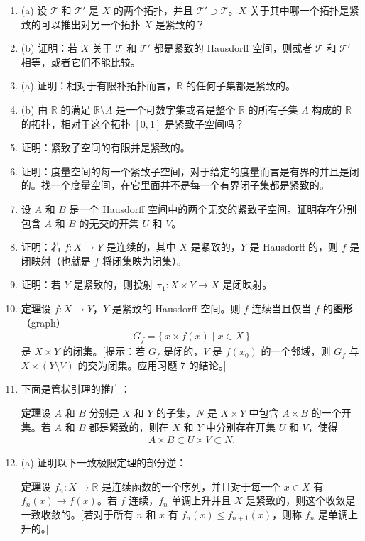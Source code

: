 \begin{enumerate}
\item (a) 设 $\mathscr{T}$ 和 $\mathscr{T}'$ 是 $X$ 的两个拓扑，并且 $\mathscr{T}'\supset\mathscr{T}$。$X$ 关于其中哪一个拓扑是紧致的可以推出对另一个拓扑 $X$ 是紧致的？
\item (b) 证明：若 $X$ 关于 $\mathscr{T}$ 和 $\mathscr{T}'$ 都是紧致的 Hausdorff 空间，则或者 $\mathscr{T}$ 和 $\mathscr{T}'$ 相等，或者它们不能比较。
\item (a) 证明：相对于有限补拓扑而言，$\mathbb{R}$ 的任何子集都是紧致的。
\item (b) 由 $\mathbb{R}$ 的满足 $\mathbb{R}\setminus A$ 是一个可数字集或者是整个 $\mathbb{R}$ 的所有子集 $A$ 构成的 $\mathbb{R}$ 的拓扑，相对于这个拓扑 $[0,1]$ 是紧致子空间吗？
\item 证明：紧致子空间的有限并是紧致的。
\item 证明：度量空间的每一个紧致子空间，对于给定的度量而言是有界的并且是闭的。找一个度量空间，在它里面并不是每一个有界闭子集都是紧致的。
\item 设 $A$ 和 $B$ 是一个 Hausdorff 空间中的两个无交的紧致子空间。证明存在分别包含 $A$ 和 $B$ 的无交的开集 $U$ 和 $V$。
\item 证明：若 $f\colon X\to Y$ 是连续的，其中 $X$ 是紧致的，$Y$ 是 Hausdorff 的，则 $f$ 是闭映射（也就是 $f$ 将闭集映为闭集）。
\item 证明：若 $Y$ 是紧致的，则投射 $\pi_{1}\colon X\times Y\to X$ 是闭映射。
\item \textbf{定理}\quad 设 $f\colon X\to Y$，$Y$ 是紧致的 Hausdorff 空间。则 $f$ 连续当且仅当 $f$ 的\textbf{图形}（graph）
\begin{align*}
G_{f}=\{\,x\times f(x)\mid x\in X\,\}
\end{align*}
是 $X\times Y$ 的闭集。[提示：若 $G_{f}$ 是闭的，$V$ 是 $f(x_{0})$ 的一个邻域，则 $G_{f}$ 与 $X\times(Y\setminus V)$ 的交为闭集。应用习题 7 的结论。]
\item 下面是管状引理的推广：

\textbf{定理}\quad 设 $A$ 和 $B$ 分别是 $X$ 和 $Y$ 的子集，$N$ 是 $X\times Y$ 中包含 $A\times B$ 的一个开集。若 $A$ 和 $B$ 都是紧致的，则在 $X$ 和 $Y$ 中分别存在开集 $U$ 和 $V$，使得
\begin{align*}
A\times B\subset U\times V\subset N.
\end{align*}
\item (a) 证明以下一致极限定理的部分逆：

\textbf{定理}\quad 设 $f_{n}\colon X\to\mathbb{R}$ 是连续函数的一个序列，并且对于每一个 $x\in X$ 有 $f_{n}(x)\to f(x)$。若 $f$ 连续，$f_{n}$ 单调上升并且 $X$ 是紧致的，则这个收敛是一致收敛的。[若对于所有 $n$ 和 $x$ 有 $f_{n}(x)\leqslant f_{n+1}(x)$，则称 $f_{n}$ 是单调上升的。]


\end{enumerate}
